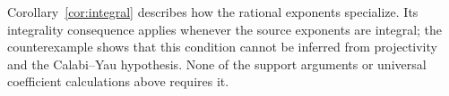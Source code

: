 Corollary~\ref{cor:integral} describes how the rational exponents
specialize. Its integrality consequence applies whenever the source
exponents are integral; the counterexample shows that this condition
cannot be inferred from projectivity and the Calabi--Yau hypothesis.
None of the support arguments or universal coefficient calculations
above requires it.
